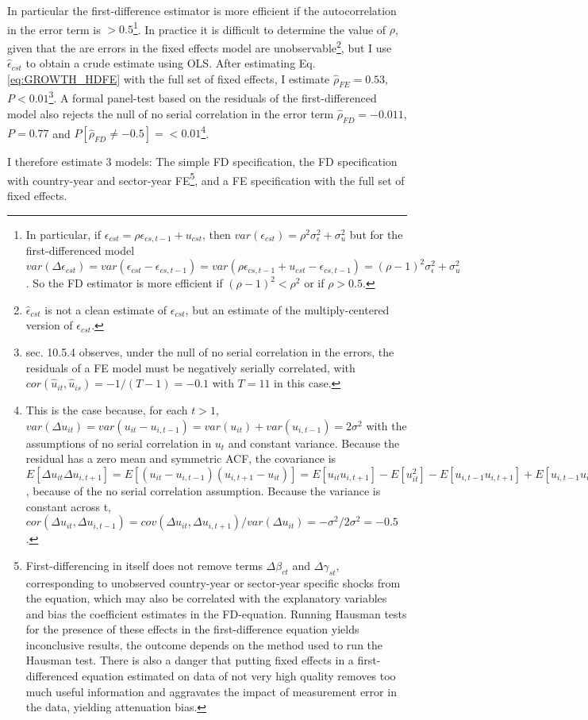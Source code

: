 \documentclass[a4paper]{article}
\begin{document}
In particular the first-difference estimator is more efficient if the autocorrelation in the error term is $> 0.5$\footnote{In particular, if $\epsilon_{cst} = \rho \epsilon_{cs,t-1} + u_{cst}$, then $var(\epsilon_{cst}) = \rho^2 \sigma^2_\epsilon + \sigma^2_u$ but for the first-differenced model $var(\Delta \epsilon_{cst}) = var(\epsilon_{cst} - \epsilon_{cs,t-1}) = var(\rho \epsilon_{cs,t-1} + u_{cst} - \epsilon_{cs,t-1}) = (\rho-1)^2 \sigma^2_\epsilon + \sigma^2_u$. So the FD estimator is more efficient if $(\rho-1)^2<\rho^2$ or if $\rho > 0.5$.}. In practice it is difficult to determine the value of $\rho$, given that the are errors in the fixed effects model are unobservable\footnote{$\hat{\epsilon}_{cst}$ is not a clean estimate of $\epsilon_{cst}$, but an estimate of the multiply-centered version of $\epsilon_{cst}$.}, but I use $\hat{\epsilon}_{cst}$ to obtain a crude estimate using OLS. After estimating Eq. \ref{eq:GROWTH_HDFE} with the full set of fixed effects, I estimate $\hat{\rho}_{FE} = 0.53$, $P<0.01$\footnote{\citet{wooldridge2010econometric} sec. 10.5.4 observes, under the null of no serial correlation in the errors, the residuals of a FE model must be negatively serially correlated, with $cor(\hat{u}_{it}, \hat{u}_{is})=-1/(T-1) = -0.1$ with $T = 11$ in this case.}. A formal panel-test based on the residuals of the first-differenced model also rejects the null of no serial correlation in the error term $\hat{\rho}_{FD} = -0.011$, $P=0.77$ and $P[\hat{\rho}_{FD} \neq -0.5]=<0.01$\footnote{This is the case because, for each $t > 1$, $var(\Delta u_{it}) = var(u_{it} - u_{i,t-1}) = var(u_{it}) + var(u_{i,t-1}) = 2\sigma^2$ with the assumptions of no serial correlation in $u_t$ and constant variance. Because the residual has a zero mean and symmetric ACF, the covariance is $E[\Delta u_{it}\Delta u_{i,t+1}] = E[(u_{it} - u_{i,t-1})(u_{i,t+1} - u_{it})] = E[u_{it} u_{i,t+1}] - E[u_{it}^2] - E[u_{i,t-1} u_{i,t+1}] + E[u_{i,t-1} u_{it}] = -E[u_{it}^2] = -\sigma^2$, because of the no serial correlation assumption. Because the variance is constant across t, $cor(\Delta u_{it},  \Delta u_{i,t-1}) = cov(\Delta u_{it},  \Delta u_{i,t+1})/var(\Delta u_{it}) = -\sigma^2/2\sigma^2 = -0.5$.}.  \newline

I therefore estimate 3 models: The simple FD specification, the FD specification with country-year and sector-year FE\footnote{First-differencing in itself does not remove terms $\Delta\beta_{ct}$ and $\Delta\gamma_{st}$, corresponding to unobserved country-year or sector-year specific shocks from the equation, which may also be correlated with the explanatory variables and bias the coefficient estimates in the FD-equation. Running Hausman tests for the presence of these effects in the first-difference equation yields inconclusive results, the outcome depends on the method used to run the Hausman test. There is also a danger that putting fixed effects in a first-differenced equation estimated on data of not very high quality removes too much useful information and aggravates the impact of measurement error in the data, yielding attenuation bias.}, and a FE specification with the full set of fixed effects. \newline 
\end{document}
